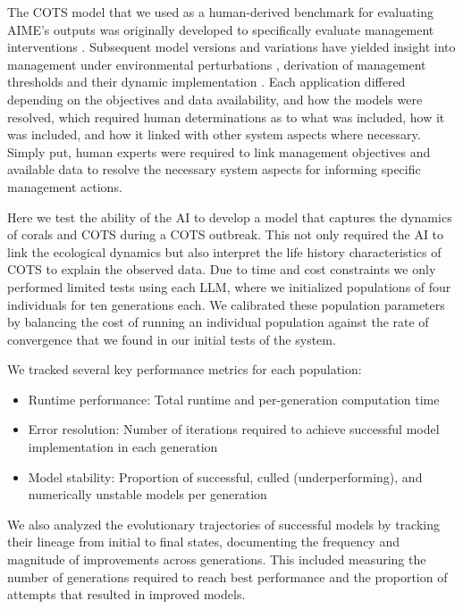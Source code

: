 The COTS model that we used as a human-derived benchmark for evaluating AIME's outputs was originally developed to specifically evaluate management interventions \citep{morello2014model}. Subsequent model versions and variations have yielded insight into management under environmental perturbations \citep{Rogers_Plaganyi_2022,Condie_Anthony_Babcock_Baird_Beeden_Fletcher_Gorton_Harrison_Hobday_Plaganyi_et_al_2021}, derivation of management thresholds \citep{plaganyi2020ecological,rogers2024validating} and their dynamic implementation \citep{rogers2023improving}. Each application differed depending on the objectives and data availability, and how the models were resolved, which required human determinations as to what was included, how it was included, and how it linked with other system aspects where necessary. Simply put, human experts were required to link management objectives and available data to resolve the necessary system aspects for informing specific management actions. 

Here we test the ability of the AI to develop a model that captures the dynamics of corals and COTS during a COTS outbreak. This not only required the AI to link the ecological dynamics but also interpret the life history characteristics of COTS to explain the observed data. Due to time and cost constraints we only performed limited tests using each LLM, where we initialized populations of four individuals for ten generations each. We calibrated these population parameters by balancing the cost of running an individual population against the rate of convergence that we found in our initial tests of the system.

We tracked several key performance metrics for each population:
\begin{itemize}
    \item Runtime performance: Total runtime and per-generation computation time
    \item Error resolution: Number of iterations required to achieve successful model implementation in each generation
    \item Model stability: Proportion of successful, culled (underperforming), and numerically unstable models per generation
\end{itemize}

We also analyzed the evolutionary trajectories of successful models by tracking their lineage from initial to final states, documenting the frequency and magnitude of improvements across generations. This included measuring the number of generations required to reach best performance and the proportion of attempts that resulted in improved models.

